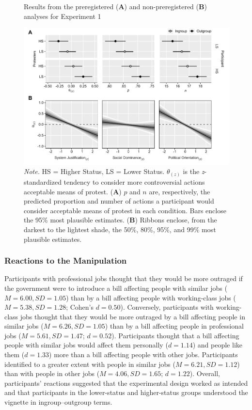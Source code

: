 \documentclass[twocolumn, 11pt, letterpaper]{article}
\begin{document}
\begin{figure}[!t]
\centering
\caption{Results from the preregistered (\textbf{A}) and non-preregistered (\textbf{B}) analyses for Experiment 1}
\includegraphics[scale=1]{../Experiment 1/figures/figure-3}
\caption*{\textit{Note.} HS = Higher Status, LS = Lower Status. $\theta_{(z)}$ is the \textit{z}-standardized tendency to consider more controversial actions acceptable means of protest. (\textbf{A}) $p$ and $n$ are, respectively, the predicted proportion and number of actions a participant would consider acceptable means of protest in each condition. Bars enclose the 95\% most plausible estimates. (\textbf{B}) Ribbons enclose, from the darkest to the lightest shade, the 50\%, 80\%, 95\%, and 99\% most plausible estimates.}
\label{fig:f3}
\end{figure}

\hypertarget{reactions-to-the-manipulation}{%
\subsubsection{Reactions to the
Manipulation}\label{reactions-to-the-manipulation}}

Participants with professional jobs thought that they would be more
outraged if the government were to introduce a bill affecting people
with similar jobs (\(M = 6.00, SD = 1.05\)) than by a bill affecting
people with working-class jobs (\(M = 5.38, SD = 1.28\); Cohen's
\(d = 0.50\)). Conversely, participants with working-class jobs thought
that they would be more outraged by a bill affecting people in similar
jobs (\(M = 6.26, SD = 1.05\)) than by a bill affecting people in
professional jobs (\(M = 5.61, SD = 1.47\); \(d = 0.52\)). Participants
thought that a bill affecting people with similar jobs would affect them
personally (\(d = 1.14\)) and people like them (\(d = 1.33\)) more than
a bill affecting people with other jobs. Participants identified to a
greater extent with people in similar jobs (\(M = 6.21, SD = 1.12\))
than with people in other jobs (\(M = 4.06, SD = 1.65\); \(d = 1.22\)).
Overall, participants' reactions suggested that the experimental design
worked as intended and that participants in the lower-status and
higher-status groups understood the vignette in ingroup--outgroup terms.
\end{document}
